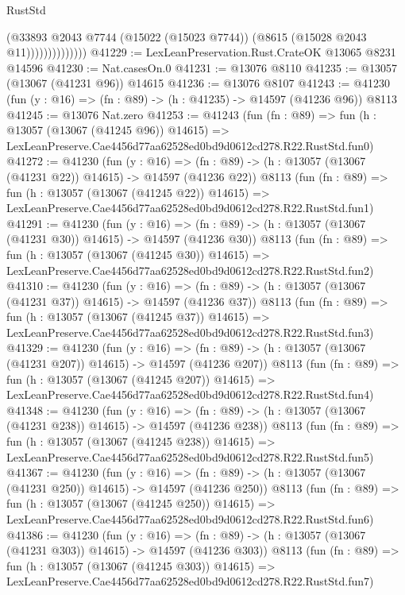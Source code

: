 \begin{lexlean}{RustStd}
\begin{coremodule}
                          (@33893
                            @2043
                            @7744
                            (@15022 (@15023 @7744))
                            (@8615 (@15028 @2043 @11))))))))))))))
@41229 := LexLeanPreservation.Rust.CrateOK @13065 @8231 @14596
@41230 := Nat.casesOn.{0}
@41231 := @13076 @8110
@41235 := @13057 (@13067 (@41231 @96)) @14615
@41236 := @13076 @8107
@41243 := @41230 (fun (y : @16) => (fn : @89) -> (h : @41235) -> @14597 (@41236 @96)) @8113
@41245 := @13076 Nat.zero
@41253 := @41243
    (fun (fn : @89) =>
    fun (h : @13057 (@13067 (@41245 @96)) @14615) =>
    LexLeanPreserve.Cae4456d77aa62528ed0bd9d0612cd278.R22.RustStd.fun0)
@41272 := @41230
    (fun (y : @16) =>
    (fn : @89) -> (h : @13057 (@13067 (@41231 @22)) @14615) -> @14597 (@41236 @22))
    @8113
    (fun (fn : @89) =>
    fun (h : @13057 (@13067 (@41245 @22)) @14615) =>
    LexLeanPreserve.Cae4456d77aa62528ed0bd9d0612cd278.R22.RustStd.fun1)
@41291 := @41230
    (fun (y : @16) =>
    (fn : @89) -> (h : @13057 (@13067 (@41231 @30)) @14615) -> @14597 (@41236 @30))
    @8113
    (fun (fn : @89) =>
    fun (h : @13057 (@13067 (@41245 @30)) @14615) =>
    LexLeanPreserve.Cae4456d77aa62528ed0bd9d0612cd278.R22.RustStd.fun2)
@41310 := @41230
    (fun (y : @16) =>
    (fn : @89) -> (h : @13057 (@13067 (@41231 @37)) @14615) -> @14597 (@41236 @37))
    @8113
    (fun (fn : @89) =>
    fun (h : @13057 (@13067 (@41245 @37)) @14615) =>
    LexLeanPreserve.Cae4456d77aa62528ed0bd9d0612cd278.R22.RustStd.fun3)
@41329 := @41230
    (fun (y : @16) =>
    (fn : @89) -> (h : @13057 (@13067 (@41231 @207)) @14615) -> @14597 (@41236 @207))
    @8113
    (fun (fn : @89) =>
    fun (h : @13057 (@13067 (@41245 @207)) @14615) =>
    LexLeanPreserve.Cae4456d77aa62528ed0bd9d0612cd278.R22.RustStd.fun4)
@41348 := @41230
    (fun (y : @16) =>
    (fn : @89) -> (h : @13057 (@13067 (@41231 @238)) @14615) -> @14597 (@41236 @238))
    @8113
    (fun (fn : @89) =>
    fun (h : @13057 (@13067 (@41245 @238)) @14615) =>
    LexLeanPreserve.Cae4456d77aa62528ed0bd9d0612cd278.R22.RustStd.fun5)
@41367 := @41230
    (fun (y : @16) =>
    (fn : @89) -> (h : @13057 (@13067 (@41231 @250)) @14615) -> @14597 (@41236 @250))
    @8113
    (fun (fn : @89) =>
    fun (h : @13057 (@13067 (@41245 @250)) @14615) =>
    LexLeanPreserve.Cae4456d77aa62528ed0bd9d0612cd278.R22.RustStd.fun6)
@41386 := @41230
    (fun (y : @16) =>
    (fn : @89) -> (h : @13057 (@13067 (@41231 @303)) @14615) -> @14597 (@41236 @303))
    @8113
    (fun (fn : @89) =>
    fun (h : @13057 (@13067 (@41245 @303)) @14615) =>
    LexLeanPreserve.Cae4456d77aa62528ed0bd9d0612cd278.R22.RustStd.fun7)

\end{coremodule}
\end{lexlean}
